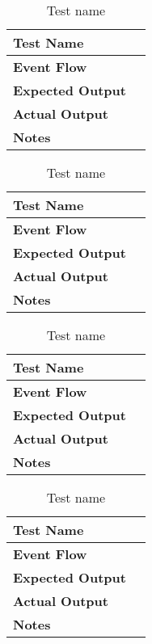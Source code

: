 \begin{table}[h]	
\centering
\def\arraystretch{1.5}
\begin{tabular}{|m{7cm}|m{7cm}|}
	\hline
	\textbf{Test Name}            &    \\ \hline
	\textbf{Event Flow}             &   \\ \hline
	\textbf{Expected Output}  &     \\ \hline
	\textbf{Actual Output}       &     \\ \hline
	\textbf{Notes} & \\ \hline
\end{tabular}
\caption{Test name}
\end{table}


\begin{table}[h]	
\centering
\def\arraystretch{1.5}
\begin{tabular}{|m{7cm}|m{7cm}|}
	\hline
	\textbf{Test Name}            &    \\ \hline
	\textbf{Event Flow}             &   \\ \hline
	\textbf{Expected Output}  &     \\ \hline
	\textbf{Actual Output}       &     \\ \hline
	\textbf{Notes} & \\ \hline
\end{tabular}
\caption{Test name}
\end{table}


\begin{table}[h]	
\centering
\def\arraystretch{1.5}
\begin{tabular}{|m{7cm}|m{7cm}|}
	\hline
	\textbf{Test Name}            &    \\ \hline
	\textbf{Event Flow}             &   \\ \hline
	\textbf{Expected Output}  &     \\ \hline
	\textbf{Actual Output}       &     \\ \hline
	\textbf{Notes} & \\ \hline
\end{tabular}
\caption{Test name}
\end{table}


\begin{table}[h]	
\centering
\def\arraystretch{1.5}
\begin{tabular}{|m{7cm}|m{7cm}|}
	\hline
	\textbf{Test Name}            &    \\ \hline
	\textbf{Event Flow}             &   \\ \hline
	\textbf{Expected Output}  &     \\ \hline
	\textbf{Actual Output}       &     \\ \hline
	\textbf{Notes} & \\ \hline
\end{tabular}
\caption{Test name}
\end{table}


